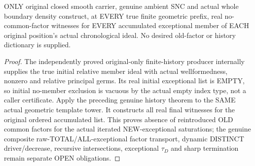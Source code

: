 \begin{theorem}
\label{hir:sharp-original-all-member-finite-chronological-no-exceptional-factor}
\leanok
ONLY original closed smooth carrier, genuine ambient SNC and actual whole
boundary density construct, at EVERY true finite geometric prefix, real
no-common-factor witnesses for EVERY accumulated exceptional member of EACH
original position's actual chronological ideal. No desired old-factor or
history dictionary is supplied.
\end{theorem}
\begin{proof}
The independently proved original-only finite-history producer internally
supplies the true initial relative member ideal with actual wellformedness,
nonzero and relative principal germs. Its real initial exceptional list is
EMPTY, so initial no-member exclusion is vacuous by the actual empty index
type, not a caller certificate. Apply the preceding genuine history theorem
to the SAME actual geometric template tower. It constructs all real final
witnesses for the original ordered accumulated list. This proves absence of
reintroduced OLD common factors for the actual iterated NEW-exceptional
saturations; the genuine composite raw-TOTAL/ALL-exceptional factor transport,
dynamic DISTINCT driver/decrease, recursive intersections, exceptional
$\tau_D$ and sharp termination remain separate OPEN obligations.
\end{proof}
